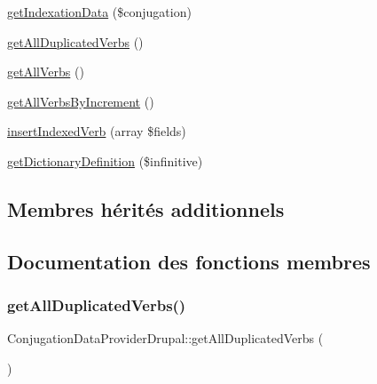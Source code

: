 \begin{DoxyCompactItemize}
\item 
\hyperlink{class_conjugation_data_provider_drupal_a3cd6ea1c1628a03e31095b3c5589e9b7}{get\+Indexation\+Data} (\$conjugation)
\item 
\hyperlink{class_conjugation_data_provider_drupal_a4a933054f17ac39bc1f8511d46f458a0}{get\+All\+Duplicated\+Verbs} ()
\item 
\hyperlink{class_conjugation_data_provider_drupal_a6f5059d90f7186ec52a2755376f2734c}{get\+All\+Verbs} ()
\item 
\hyperlink{class_conjugation_data_provider_drupal_a28b01db0d2e9a1c72f6eaadaba71de33}{get\+All\+Verbs\+By\+Increment} ()
\item 
\hyperlink{class_conjugation_data_provider_drupal_a3a8340c3d8abaa7e28f2f84c8c00a307}{insert\+Indexed\+Verb} (array \$fields)
\item 
\hyperlink{class_conjugation_data_provider_drupal_ab22abe0370abb175544efd352f96a468}{get\+Dictionary\+Definition} (\$infinitive)
\end{DoxyCompactItemize}
\subsection*{Membres hérités additionnels}


\subsection{Documentation des fonctions membres}
\hypertarget{class_conjugation_data_provider_drupal_a4a933054f17ac39bc1f8511d46f458a0}{}\label{class_conjugation_data_provider_drupal_a4a933054f17ac39bc1f8511d46f458a0} 
\subsubsection{\texorpdfstring{get\+All\+Duplicated\+Verbs()}{getAllDuplicatedVerbs()}}
{\footnotesize\ttfamily Conjugation\+Data\+Provider\+Drupal\+::get\+All\+Duplicated\+Verbs (\begin{DoxyParamCaption}{ }\end{DoxyParamCaption})}

\hypertarget{class_conjugation_data_provider_drupal_a6f5059d90f7186ec52a2755376f2734c}{}\label{class_conjugation_data_provider_drupal_a6f5059d90f7186ec52a2755376f2734c} 
